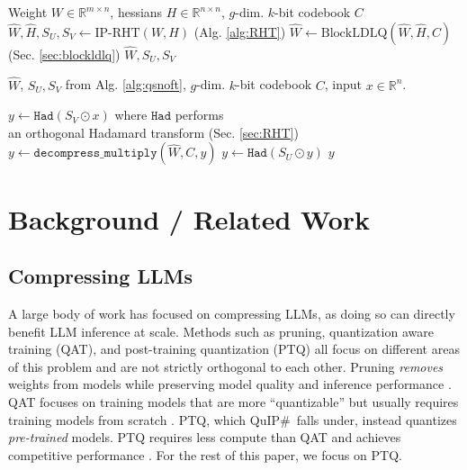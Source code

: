 \begin{algorithm}
\caption{QuIP$\#$\  without Fine-Tuning (QuIP$\#$-NoFT)}
\begin{algorithmic}
\INPUT Weight $W \in \mathbb{R}^{m \times n}$, hessians $H\in\mathbb{R}^{n\times n}$, $g$-dim. $k$-bit codebook $C$
\STATE $\hat W, \hat H, S_U, S_V \gets \mbox{IP-RHT}(W, H)$ (Alg. \ref{alg:RHT})
\STATE $\hat W \gets \mbox{BlockLDLQ}(\hat W, \hat H, C)$ (Sec. \ref{sec:blockldlq})
\OUTPUT $\hat W, S_U, S_V$
\end{algorithmic}
\label{alg:qsnoft}
\end{algorithm}

\begin{algorithm}
\caption{QuIP$\#$\  Inference (for a Linear Layer)}
\begin{algorithmic}
\INPUT $\hat W$, $S_U, S_V$ from Alg. \ref{alg:qsnoft}, $g$-dim. $k$-bit codebook $C$, input $x \in \mathbb{R}^n$.

\STATE $y \gets \texttt{Had}(S_V \odot x)$ where $\texttt{Had}$ performs \\  an orthogonal Hadamard transform (Sec. \ref{sec:RHT})
\STATE $y \gets \texttt{decompress_multiply}(\hat W, C, y)$
\STATE $y \gets \texttt{Had}(S_U \odot y)$
\OUTPUT $y$ 
\end{algorithmic}
\label{alg:qsinf}
\end{algorithm}

\section{Background / Related Work}

\subsection{Compressing LLMs}

A large body of work has focused on compressing LLMs, as doing so can directly benefit LLM inference at scale. Methods such as pruning, quantization aware training (QAT), and post-training quantization (PTQ) all focus on different areas of this problem and are not strictly orthogonal to each other. Pruning \textit{removes} weights from models while preserving model quality and inference performance \cite{jerrypruning, wanda}. QAT focuses on training models that are more ``quantizable'' but usually requires training models from scratch \cite{nagelqat,xi20234bit}. PTQ, which QuIP$\#$\  falls under, instead quantizes \textit{pre-trained} models. PTQ requires less compute than QAT and achieves competitive performance \cite{chee2023quip,optq,omniquant,aqlm}. For the rest of this paper, we focus on PTQ.

